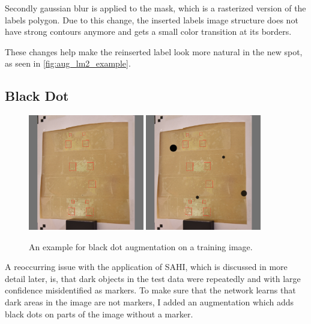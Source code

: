 \documentclass[10pt]{book}
\newcommand{\figureref}[1]{\autoref{#1}}
\begin{document}
Secondly gaussian blur is applied to the mask, which is a rasterized version of the labels polygon. Due to this change, the inserted labels image structure does not have strong contours anymore and gets a small color transition at its borders.

These changes help make the reinserted label look more natural in the new spot, as seen in \figureref{fig:aug_lm2_example}.

\subsection{Black Dot}

\begin{figure}
  \centering
     {\includegraphics[width=0.45\textwidth]{image/aug_bd_before}}
     {\includegraphics[width=0.45\textwidth]{image/aug_bd_after}}
  \caption{An example for black dot augmentation on a training image.}
  \label{fig:aug_bd_example}
\end{figure}

A reoccurring issue with the application of \ac{SAHI}, which is discussed in more detail later, is, that dark objects in the test data were repeatedly and with large confidence misidentified as markers. To make sure that the network learns that dark areas in the image are not markers, I added an augmentation which adds black dots on parts of the image without a marker. 
\end{document}
